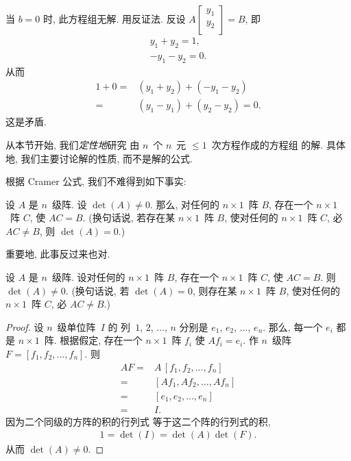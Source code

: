 \begin{example}
    当 \(b = 0\) 时, 此方程组无解.
    用反证法.
    反设
    \(
    A \begin{bmatrix}
        y_1 \\
        y_2 \\
    \end{bmatrix}
    = B
    \),
    即
    \begin{align*}
        y_1 + y_2 = 1, \\
        -y_1 - y_2 = 0.
    \end{align*}
    从而
    \begin{align*}
        1 + 0
        = {} & (y_1 + y_2) + (-y_1 - y_2)     \\
        = {} & (y_1 - y_1) + (y_2 - y_2) = 0.
    \end{align*}
    这是矛盾.
\end{example}

从本节开始, 我们\emph{定性地}研究%
由 \(n\)~个 \(n\)~元 \({\leq} 1\)~次方程作成的方程组%
的解.
具体地, 我们主要讨论解的性质,
而不是解的公式.

根据 Cramer 公式, 我们不难得到如下事实:

\begin{theorem}
    设 \(A\) 是 \(n\)~级阵.
    设 \(\det {(A)} \neq 0\).
    那么, 对任何的 \(n \times 1\)~阵 \(B\),
    存在一个 \(n \times 1\)~阵 \(C\),
    使 \(AC = B\).
    (换句话说,
    若存在某 \(n \times 1\)~阵 \(B\),
    使对任何的 \(n \times 1\)~阵 \(C\),
    必 \(AC \neq B\),
    则 \(\det {(A)} = 0\).)
\end{theorem}

重要地, 此事反过来也对.

\begin{theorem}
    设 \(A\) 是 \(n\)~级阵.
    设对任何的 \(n \times 1\)~阵 \(B\),
    存在一个 \(n \times 1\)~阵 \(C\),
    使 \(AC = B\).
    则 \(\det {(A)} \neq 0\).
    (换句话说,
    若 \(\det {(A)} = 0\),
    则存在某 \(n \times 1\)~阵 \(B\),
    使对任何的 \(n \times 1\)~阵 \(C\),
    必 \(AC \neq B\).)
\end{theorem}

\begin{proof}
    设 \(n\)~级单位阵~\(I\) 的%
    列~\(1\), \(2\), \(\dots\), \(n\)
    分别是
    \(e_1\), \(e_2\), \(\dots\), \(e_n\).
    那么, 每一个 \(e_i\) 都是 \(n \times 1\)~阵.
    根据假定, 存在一个 \(n \times 1\)~阵 \(f_i\)
    使 \(Af_i = e_i\).
    作 \(n\)~级阵
    \(F = [f_1, f_2, \dots, f_n]\).
    则
    \begin{align*}
        AF
        = {} & A\, [f_1, f_2, \dots, f_n] \\
        = {} & [Af_1, Af_2, \dots, Af_n]  \\
        = {} & [e_1, e_2, \dots, e_n]     \\
        = {} & I.
    \end{align*}
    因为二个同级的方阵的积的行列式%
    等于这二个阵的行列式的积,
    \begin{align*}
        1 = \det {(I)} = \det {(A)} \det {(F)}.
    \end{align*}
    从而 \(\det {(A)} \neq 0\).
\end{proof}

